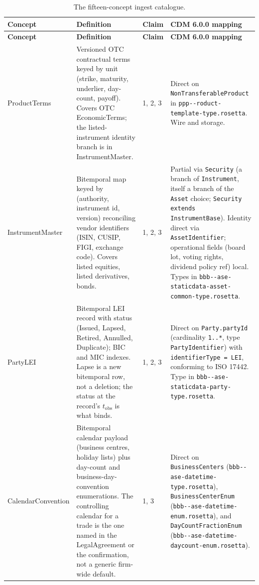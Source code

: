 \documentclass[11pt,a4paper]{article}
\makeatletter
\newcounter{rul}
\def\rfile#1{\texttt{\@rfile #1\relax}}
\def\@rfile#1{\ifx#1\relax\else#1\ifx#1-\penalty100\fi\expandafter\@rfile\fi}
\makeatother
\begin{document}
\begin{footnotesize}
\renewcommand{\arraystretch}{1.10}
\begin{longtable}{@{}>{\raggedright\arraybackslash}p{2.4cm}p{5.7cm}p{0.7cm}p{6.7cm}@{}}
\caption{The fifteen-concept ingest catalogue.}\label{tab:catalogue}\\
\toprule
\textbf{Concept} & \textbf{Definition} & \textbf{Claim} & \textbf{CDM 6.0.0 mapping} \\
\midrule
\endfirsthead
\toprule
\textbf{Concept} & \textbf{Definition} & \textbf{Claim} & \textbf{CDM 6.0.0 mapping} \\
\midrule
\endhead
\bottomrule
\endfoot
Product\-Terms & Versioned OTC contractual terms keyed by unit (strike, maturity, underlier, day-count, payoff). Covers OTC EconomicTerms; the listed-instrument identity branch is in InstrumentMaster. & 1, 2, 3 & Direct on \texttt{NonTransferableProduct} in \rfile{product-template-type.rosetta}. Wire and storage. \\
Instrument\-Master & Bitemporal map keyed by (authority, instrument id, version) reconciling vendor identifiers (ISIN, CUSIP, FIGI, exchange code). Covers listed equities, listed derivatives, bonds. & 1, 2, 3 & Partial via \texttt{Security} (a branch of \texttt{Instrument}, itself a branch of the \texttt{Asset} choice; \texttt{Security extends InstrumentBase}). Identity direct via \texttt{AssetIdentifier}; operational fields (board lot, voting rights, dividend policy ref) local. Types in \rfile{base-staticdata-asset-common-type.rosetta}. \\
PartyLEI & Bitemporal LEI record with status (Issued, Lapsed, Retired, Annulled, Duplicate); BIC and MIC indexes. Lapse is a new bitemporal row, not a deletion; the status at the record's $t_{\text{obs}}$ is what binds. & 1, 2, 3 & Direct on \texttt{Party.partyId} (cardinality \texttt{1..*}, type \texttt{PartyIdentifier}) with \texttt{identifierType = LEI}, conforming to ISO 17442. Type in \rfile{base-staticdata-party-type.rosetta}. \\
Calendar\-Convention & Bitemporal calendar payload (business centres, holiday lists) plus day-count and business-day-convention enumerations. The controlling calendar for a trade is the one named in the LegalAgreement or the confirmation, not a generic firm-wide default. & 1, 3 & Direct on \texttt{BusinessCenters} (\rfile{base-datetime-type.rosetta}), \texttt{BusinessCenterEnum} (\rfile{base-datetime-enum.rosetta}), and \texttt{DayCountFractionEnum} (\rfile{base-datetime-daycount-enum.rosetta}). \\

\end{longtable}
\end{footnotesize}
\end{document}
